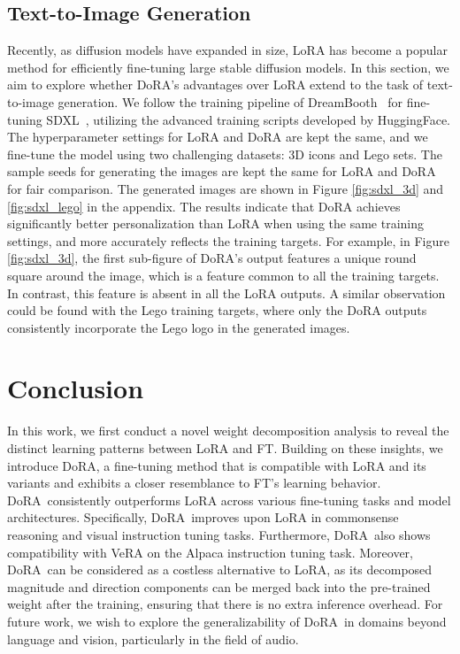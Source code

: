 \documentclass{article}
\newcommand{\ours}{DoRA}
\theoremstyle{plain}
\theoremstyle{definition}
\theoremstyle{remark}
\begin{document}
\subsection{Text-to-Image Generation}
Recently, as diffusion models have expanded in size, LoRA has become a popular method for efficiently fine-tuning large stable diffusion models. In this section, we aim to explore whether DoRA's advantages over LoRA extend to the task of text-to-image generation. We follow the training pipeline of DreamBooth~\cite{ruiz2023dreambooth} for fine-tuning SDXL~\cite{podell2023sdxl}, utilizing the advanced training scripts developed by HuggingFace. The hyperparameter settings for LoRA and DoRA are kept the same, and we fine-tune the model using two challenging datasets: 3D icons and Lego sets. The sample seeds for generating the images are kept the same for LoRA and DoRA for fair comparison. The generated images are shown in Figure \ref{fig:sdxl_3d} and \ref{fig:sdxl_lego} in the appendix. The results indicate that DoRA achieves significantly better personalization than LoRA when using the same training settings, and more accurately reflects the training targets. For example, in Figure \ref{fig:sdxl_3d}, the first sub-figure of DoRA's output features a unique round square around the image, which is a feature common to all the training targets. In contrast, this feature is absent in all the LoRA outputs. A similar observation could be found with the Lego training targets, where only the DoRA outputs consistently incorporate the Lego logo in the generated images.

\section{Conclusion}
In this work, we first conduct a novel weight decomposition analysis to reveal the distinct learning patterns between LoRA and FT. Building on these insights, we introduce \ours, a fine-tuning method that is compatible with LoRA and its variants and exhibits a closer resemblance to FT's learning behavior. \ours~consistently outperforms LoRA across various fine-tuning tasks and model architectures. Specifically, \ours~improves upon LoRA in commonsense reasoning and visual instruction tuning tasks. Furthermore, \ours~also shows compatibility with VeRA on the Alpaca instruction tuning task. Moreover, \ours~can be considered as a costless alternative to LoRA, as its decomposed magnitude and direction components can be merged back into the pre-trained weight after the training, ensuring that there is no extra inference overhead. For future work, we wish to explore the generalizability of \ours~in domains beyond language and vision, particularly in the field of audio.
\end{document}
